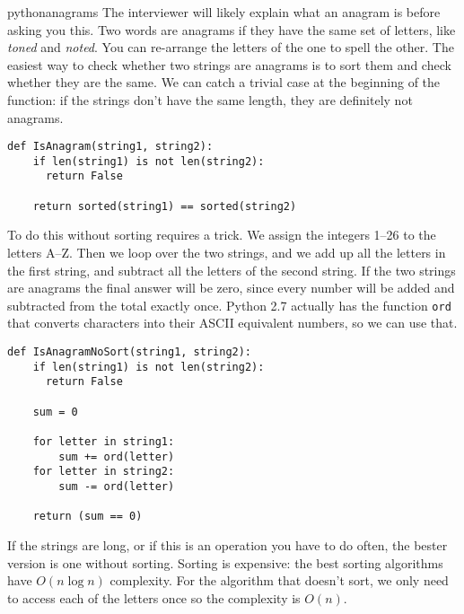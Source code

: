 \begin{answer}{pythonanagrams}
The interviewer will likely explain what an anagram is before asking you this.
Two words are anagrams if they have the same set of letters, like \emph{toned} and \emph{noted}.
You can re-arrange the letters of the one to spell the other.
The easiest way to check whether two strings are anagrams is to sort them and check whether they are the same.
We can catch a trivial case at the beginning of the function: if the strings don't have the same length, they are definitely not anagrams.
\begin{verbatim}
def IsAnagram(string1, string2):
    if len(string1) is not len(string2):
      return False

    return sorted(string1) == sorted(string2)
\end{verbatim}
%
To do this without sorting requires a trick.
We assign
the integers 1--26
to
the letters A--Z.
Then we loop over the two strings, and we add up all the letters in the first string, and subtract all the letters of the second string.
If the two strings are anagrams the final answer will be zero, since every number will be added and subtracted from the total exactly once.
Python 2.7 actually has the function \verb+ord+ that converts characters into their ASCII equivalent numbers, so we can use that.
\begin{verbatim}
def IsAnagramNoSort(string1, string2):
    if len(string1) is not len(string2):
      return False

    sum = 0

    for letter in string1:
        sum += ord(letter)
    for letter in string2:
        sum -= ord(letter)

    return (sum == 0)
\end{verbatim}

If the strings are long, or if this is an operation you have to do often, the bester version is one without sorting.
Sorting is expensive: the best sorting algorithms have $O(n\log{n})$ complexity.
For the algorithm that doesn't sort, we only need to access each of the letters once so the complexity is $O(n)$.
\end{answer}
